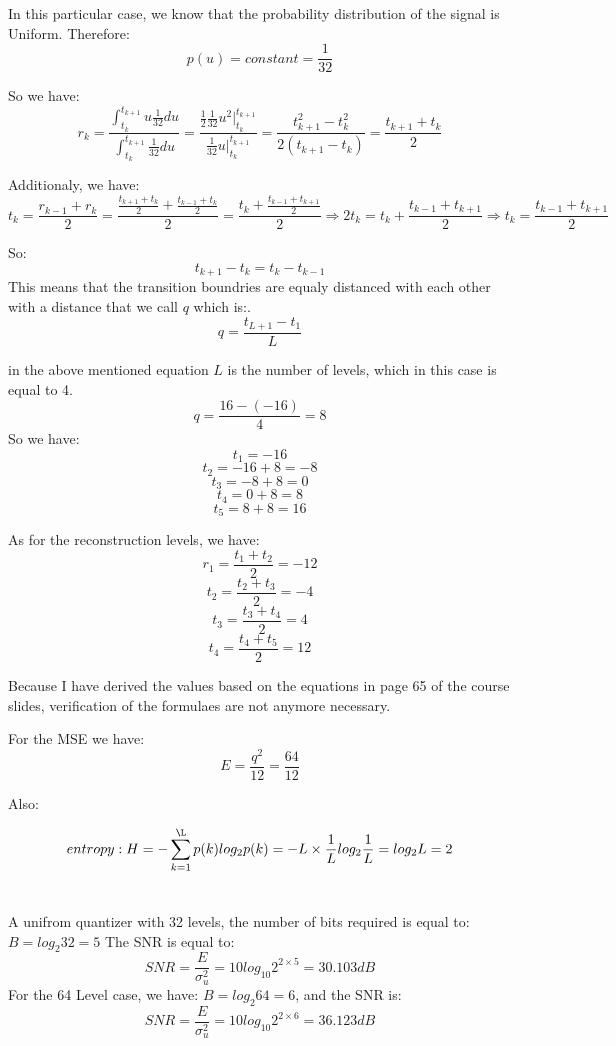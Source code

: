 \documentclass[12pt]{article}
\begin{document}
In this particular case, we know that the probability distribution of the signal is Uniform. Therefore:
$$p(u) = constant = \frac{1}{32}$$

So we have:
$$r_k =  \frac{\int_{t_k}^{t_{k + 1}} u\frac{1}{32}du}{\int_{t_k}^{t_{k + 1}}\frac{1}{32}du} = \frac{\frac{1}{2}\frac{1}{32}u^2\vert^{t_{k+1}}_{t_k}}{\frac{1}{32}u\vert^{t_{k+1}}_{t_k}} = \frac{t^{2}_{k + 1} - t^{2}_{k}}{2(t_{k + 1} - t_k)} = \frac{t_{k + 1} + t_k}{2}$$

Additionaly, we have:
$$t_{k} = \frac{r_{k-1} + r_k}{2} = \frac{ \frac{t_{k + 1} + t_k}{2} +  \frac{t_{k-1} + t_k}{2}}{2}= \frac{t_{k} +   \frac{t_{k-1} + t_{k+1}}{2}}{2}\Rightarrow 2t_{k} = t_{k} +   \frac{t_{k-1} + t_{k+1}}{2}\Rightarrow t_k =  \frac{t_{k-1} + t_{k+1}}{2}$$

So:
$$t_{k+1} - t_k = t_k - t_{k - 1} $$
This means that the transition boundries are equaly distanced with each other with a distance that we call $q$ which is:.
$$q = \frac{t_{L + 1} - t_1}{L} $$

in the above mentioned equation $L$ is the number of levels, which in this case is equal to 4.
$$q = \frac{16 - (-16)}{4} = 8$$
So we have:
$$t_1 = -16$$
$$t_2 = -16 + 8 = -8$$
$$t_3 = -8 + 8 = 0$$
$$t_4 = 0 + 8 = 8$$
$$t_5 =  8 + 8 = 16$$

As for the reconstruction levels, we have:
$$r_1 = \frac{t_1 + t_2}{2} = -12$$
$$t_2 =  \frac{t_2 + t_3}{2} = -4$$
$$t_3 = \frac{t_3 + t_4}{2} = 4$$
$$t_4 = \frac{t_4 + t_5}{2} = 12$$

Because I have derived the values based on the equations in page 65 of the course slides, verification of the formulaes are not anymore necessary.

For the MSE we have:
$$E = \frac{q^2}{12} = \frac{64}{12} $$

Also:

$$ entropy: H = - \sum^{\L}_{k = 1} p(k)log_2 p(k) =- L \times \frac{1}{L}log_2 \frac{1}{L} = log_2 L = 2$$

\section{}

A unifrom quantizer with 32 levels, the number of bits required is equal to: $ B = log_2 32 = 5$
The SNR is equal to: 
$$SNR = \frac{E}{\sigma_{u}^2} = 10 log_{10} 2^{2 \times 5} = 30.103 dB$$
For the 64 Level case, we have: $ B = log_2 64 = 6$, and the SNR is:
$$SNR = \frac{E}{\sigma_{u}^2} = 10 log_{10} 2^{2 \times 6} = 36.123 dB$$
\end{document}
